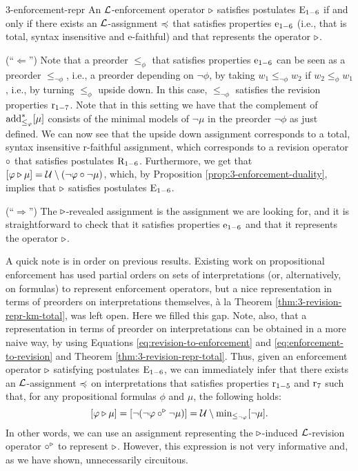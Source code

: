 \begin{thm}{}{3-enforcement-repr}
	An $\mathcal{L}$-enforcement operator $\triangleright$ 
	satisfies postulates $\mathrm{E}_{1-6}$ if and only if
	there exists an $\mathcal{L}$-assignment $\preccurlyeq$
	that satisfies properties $\mathrm{e}_{1-6}$
	(i.e., that is total, syntax insensitive and
	e-faithful)
	and that represents the operator $\triangleright$.
\end{thm}
\begin{prf*}{}{}%
	(``$\Leftarrow$'')
	Note that a preorder $\le_{\phi}$ that satisfies properties 
	$\mathrm{e}_{1-6}$ can be seen as a preorder $\le_{\lnot\phi}$,
	i.e., a preorder depending on $\lnot\phi$, 
	by taking $w_1\le_{\lnot\phi}w_2$ if $w_2 \le_{\phi}w_1$,
	i.e., by turning $\le_{\phi}$ upside down.
	In this case, $\le_{\lnot\phi}$ satisfies 
	the revision properties $\mathrm{r}_{1-7}$.
	Note that in this setting we have that the complement of 
	${\operatorname{add}}^\ast_{\le_\varphi}[\mu]$ consists of the minimal 
	models of $\lnot\mu$ in the preorder $\lnot\phi$ as just 
	defined. We can now see that the upside down assignment 
	corresponds to a total, syntax insensitive r-faithful assignment,
	which corresponds to a revision operator $\circ$ that 
	satisfies postulates $\mathrm{R}_{1-6}$.
	Furthermore, we get that 
	$[\varphi\triangleright\mu]=\mathcal{U}\setminus(\lnot\varphi\circ\lnot\mu)$,
	which, by Proposition \ref{prop:3-enforcement-duality},
	implies that $\triangleright$ satisfies postulates $\mathrm{E}_{1-6}$.

	(``$\Rightarrow$'')
	The $\triangleright$-revealed assignment is the assignment we are looking for,
	and it is straightforward to check that it satisfies properties $\mathrm{e}_{1-6}$
	and that it represents the operator $\triangleright$.
\end{prf*}

A quick note is in order on previous results.
Existing work on propositional enforcement \cite{HaretWW18} 
has used partial orders 
on sets of interpretations (or, alternatively, on formulas)
to represent enforcement operators, 
but a nice representation in terms of preorders on interpretations themselves, 
\`a la Theorem \ref{thm:3-revision-repr-km-total}, was left open.
Here we filled this gap.
Note, also, that a representation in terms of preorder on interpretations
can be obtained in a more naive way, by using 
Equations \ref{eq:revision-to-enforcement} 
and \ref{eq:enforcement-to-revision} 
and Theorem \ref{thm:3-revision-repr-total}.
Thus, given an enforcement operator $\triangleright$ 
satisfying postulates $\mathrm{E}_{1-6}$, 
we can immediately infer that there exists 
an $\mathcal{L}$-assignment $\preccurlyeq$ on interpretations
that satisfies properties $\mathrm{r}_{1-5}$ and $\mathrm{r}_{7}$ 
such that, for any propositional formulas $\phi$ and $\mu$, 
the following holds:
$$
	[\varphi\triangleright\mu] = [\lnot(\lnot\varphi\circ^\triangleright\lnot\mu)]=\mathcal{U}\setminus{\operatorname{min}}_{\le_{\lnot\varphi}}[\lnot\mu].
$$
In other words, we can use an assignment representing 
the $\triangleright$-induced $\mathcal{L}$-revision operator $\circ^\triangleright$ to represent $\triangleright$.
However, this expression is not very informative and, 
as we have shown, unnecessarily circuitous.

